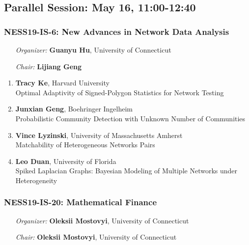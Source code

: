 
\subsection*{Parallel Session: May 16, 11:00-12:40}

\subsubsection*{NESS19-IS-6: New Advances in Network Data Analysis}

\begin{enumerate}[align=left]
\item [\emph{Organizer:}] \textbf{Guanyu Hu}, University of Connecticut \\
\item [\emph{Chair:}] \textbf{Lijiang Geng}
\end{enumerate}

\begin{enumerate}
\item \textbf{Tracy Ke}, Harvard University \\
Optimal Adaptivity of Signed-Polygon Statistics for Network Testing
\item \textbf{Junxian Geng}, Boehringer Ingelheim \\
Probabilistic Community Detection with Unknown Number of Communities
\item \textbf{Vince Lyzinski}, University of Massachusetts Amherst \\
Matchability of Heterogeneous Networks Pairs
\item \textbf{Leo Duan}, University of Florida \\
Spiked Laplacian Graphs: Bayesian Modeling of Multiple Networks under Heterogeneity
\end{enumerate}

\subsubsection*{NESS19-IS-20: Mathematical Finance}

\begin{enumerate}[align=left]
\item [\emph{Organizer:}] \textbf{Oleksii Mostovyi}, University of Connecticut \\
\item [\emph{Chair:}] \textbf{Oleksii Mostovyi}, University of Connecticut
\end{enumerate}

